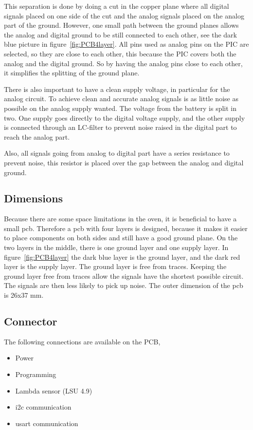 This separation is done by doing a cut in the copper plane where all digital signals placed on one side of the cut and the analog signals placed on the analog part of the ground. However, one small path between the ground planes allows the analog and digital ground to be still connected to each other, see the dark blue picture in figure~\ref{fig:PCB4layer}. All pins used as analog pins on the PIC are selected, so they are close to each other, this because the PIC covers both the analog and the digital ground. So by having the analog pins close to each other, it simplifies the splitting of the ground plane.


There is also important to have a clean supply voltage, in particular for the analog circuit. To achieve clean and accurate analog signals is as little noise as possible on the analog supply wanted. The voltage from the battery is split in two. One supply goes directly to the digital voltage supply, and the other supply is connected through an LC-filter to prevent noise raised in the digital part to reach the analog part.

Also, all signals going from analog to digital part have a series resistance to prevent noise, this resistor is placed over the gap between the analog and digital ground.

\subsection{Dimensions}

Because there are some space limitations in the oven, it is beneficial to have a small \ac{pcb}. Therefore a \ac{pcb} with four layers is designed, because it makes it easier to place components on both sides and still have a good ground plane. On the two layers in the middle, there is one ground layer and one supply layer. In figure~\ref{fig:PCB4layer} the dark blue layer is the ground layer, and the dark red layer is the supply layer. The ground layer is free from traces. Keeping the ground layer free from traces allow the signals have the shortest possible circuit. The signals are then less likely to pick up noise. The outer dimension of the \ac{pcb} is 26x37 mm.

\subsection{Connector}

The following connections are available on the PCB,

\begin{itemize}
    \item Power
    \item Programming
    \item Lambda sensor (LSU 4.9)
    \item \ac{i2c} communication
    \item \ac{usart} communication
\end{itemize}

